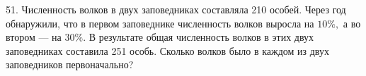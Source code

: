 51. Численность волков в двух заповедниках составляла 210 особей. Через год обнаружили, что в первом заповеднике численность волков выросла на $10\%,$ а во втором --- на $30\%.$ В результате общая численность волков в этих двух заповедниках составила 251 особь. Сколько волков было в каждом из двух заповедников первоначально?\\
